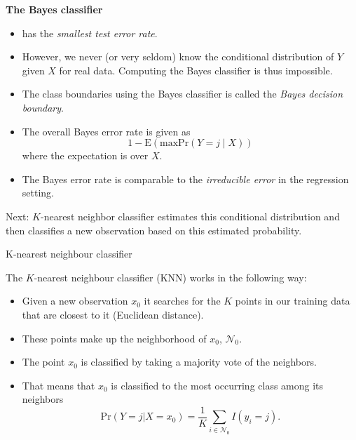 \documentclass[ignorenonframetext,]{beamer}
\providecommand{\tightlist}{%
  \setlength{\itemsep}{0pt}\setlength{\parskip}{0pt}}
\begin{document}
\begin{frame}

\textbf{The Bayes classifier}

\begin{itemize}
\tightlist
\item
  has the \emph{smallest test error rate}.
\item
  However, we never (or very seldom) know the conditional distribution
  of \(Y\) given \(X\) for real data. Computing the Bayes classifier is
  thus impossible.
\item
  The class boundaries using the Bayes classifier is called the
  \emph{Bayes decision boundary}.
\item
  The overall Bayes error rate is given as
  \[1-\text{E}(\text{max} \text{Pr}(Y=j\mid X))\] where the expectation
  is over \(X\).
\item
  The Bayes error rate is comparable to the \emph{irreducible error} in
  the regression setting.
\end{itemize}

Next: \(K\)-nearest neighbor classifier estimates this conditional
distribution and then classifies a new observation based on this
estimated probability.

\end{frame}

\begin{frame}

\begin{block}{K-nearest neighbour classifier}

The \(K\)-nearest neighbour classifier (KNN) works in the following way:

\begin{itemize}
\tightlist
\item
  Given a new observation \(x_0\) it searches for the \(K\) points in
  our training data that are closest to it (Euclidean distance).
\item
  These points make up the neighborhood of \(x_0\), \(\mathcal{N}_0\).
\item
  The point \(x_0\) is classified by taking a majority vote of the
  neighbors.
\item
  That means that \(x_0\) is classified to the most occurring class
  among its neighbors
  \[\text{Pr}(Y=j | X = x_0) = \frac{1}{K} \sum_{i \in \mathcal{N}_0} I(y_i = j).\]
\end{itemize}

\end{block}

\end{frame}
\end{document}
